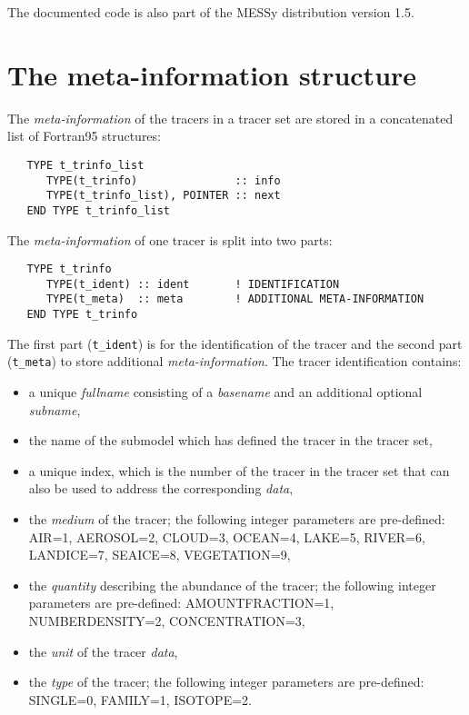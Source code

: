 \documentclass[twoside]{article}
\begin{document}
%
The documented code is also part of the MESSy distribution version 1.5.

\section{The meta-information structure}
\label{sec:meta}
%
The {\it meta-information} of the tracers in a tracer set are stored in
a concatenated list of Fortran95 structures:
\begin{verbatim}
   TYPE t_trinfo_list
      TYPE(t_trinfo)               :: info
      TYPE(t_trinfo_list), POINTER :: next
   END TYPE t_trinfo_list
\end{verbatim}

The {\it meta-information} of one tracer is split into two parts:
%
\begin{verbatim}
   TYPE t_trinfo
      TYPE(t_ident) :: ident       ! IDENTIFICATION
      TYPE(t_meta)  :: meta        ! ADDITIONAL META-INFORMATION
   END TYPE t_trinfo

\end{verbatim}
%
The first part ({\tt t\_ident}) is for the identification  of the tracer
and the second part ({\tt t\_meta}) to store additional
{\it meta-information}.
%
The tracer identification contains:
%
\begin{itemize}
 \item a unique {\it fullname} consisting of a {\it basename} and an additional
       optional {\it subname},
 \item the name of the submodel which has defined the tracer in the tracer set,
 \item a unique index, which is the number of the tracer in the tracer set
       that can also be used to address the corresponding {\it data},
 \item the {\it medium} of the tracer; the following integer parameters are
       pre-defined: AIR=1, AEROSOL=2, CLOUD=3, OCEAN=4, LAKE=5, RIVER=6,
       LANDICE=7, SEAICE=8, VEGETATION=9,
 \item the {\it quantity} describing the abundance of the tracer;
       the following integer parameters are pre-defined:
       AMOUNTFRACTION=1, NUMBERDENSITY=2, CONCENTRATION=3,
 \item the {\it unit} of the tracer {\it data},
 \item the {\it type} of the tracer; the following integer parameters are
       pre-defined: SINGLE=0, FAMILY=1, ISOTOPE=2.
\end{itemize}
\end{document}
